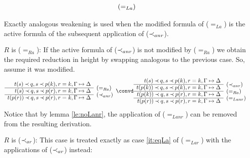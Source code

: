 \begin{PROOF}
\begin{LS}
\[\begin{array}{rl}
\raisebox{1.2ex}[1.5ex][0ex]{$(=_{La})$}
\end{array} \] 
Exactly analogous weakening is used when the modified formula of ($=_{La}$)
is the active formula of the subsequent application of ($\mathbin{\prec}_{anr}$).
%
\item $R$ is ($=_{Ra}$):
If the active formula of ($\mathbin{\prec}_{anr}$) is not modified by ($=_{Ra}$) we
obtain the required reduction in height by swapping analogous to the previous
case. So, assume it was modified.
\[ \begin{array}{rl}
t(s) \Incl q, s\Incl p(k), r=k, \Gamma\Seq\Delta \\ \cline{1-1}
t(s)\Incl q, s\Incl p(r), r=k, \Gamma\Seq\Delta &
\raisebox{1.2ex}[1.5ex][0ex]{$(=_{Ra})$} \\ \cline{1-1}
t(p(r))\Incl q, s\Incl p(r), r=k, \Gamma\Seq\Delta &
\raisebox{1.2ex}[1.5ex][0ex]{$(\Incl_{anr})$} 
\end{array} \convd
 \begin{array}{rl}
t(s) \Incl q, s\Incl p(k), r=k, \Gamma\Seq\Delta \\ \cline{1-1}
t(p(k))\Incl q, s\Incl p(k), r=k, \Gamma\Seq\Delta &
\raisebox{1.2ex}[1.5ex][0ex]{$(\Incl_{anr})$} \\ \cline{1-1}
t(p(k))\Incl q, s\Incl p(r), r=k, \Gamma\Seq\Delta &
\raisebox{1.2ex}[1.5ex][0ex]{$(=_{Ra})$} \\ \cline{1-1}
t(p(r))\Incl q, s\Incl p(r), r=k, \Gamma\Seq\Delta & \rabove{(=_{Lanr})}
\end{array} \]
Notice that by lemma \ref{le:noLanr}, the application of ($=_{Lanr}$) can be
removed from the resulting derivation.
\item $R$ is ($\mathbin{\prec}_{ar}$): This case is treated exactly as case \ref{it:eqLa} of
($=_{Lar}$) with the applications of ($\mathbin{\prec}_{ar}$) instead:

\end{LS}
\end{PROOF}
